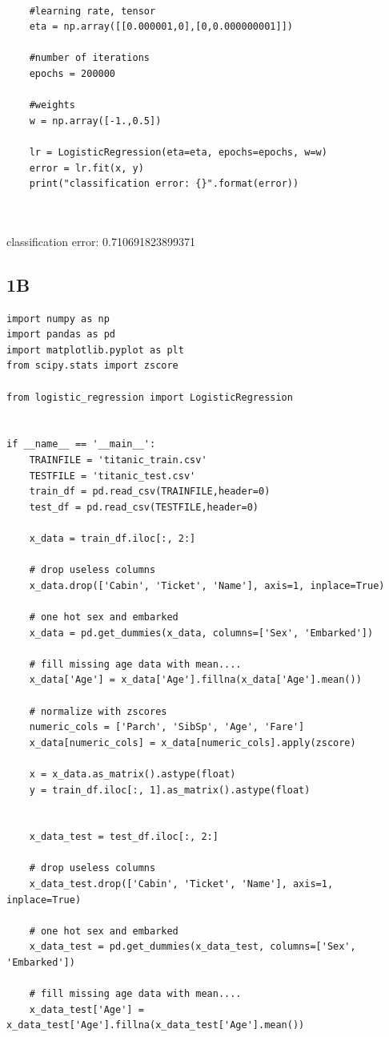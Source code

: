 \documentclass[12pt]{article}
\begin{document}
\begin{flushleft}
\begin{lstlisting}
	
	#learning rate, tensor
	eta = np.array([[0.000001,0],[0,0.000000001]])
	
	#number of iterations
	epochs = 200000
	
	#weights
	w = np.array([-1.,0.5])
	
	lr = LogisticRegression(eta=eta, epochs=epochs, w=w)
	error = lr.fit(x, y)
	print("classification error: {}".format(error))



		\end{lstlisting}
		
		classification error: 0.710691823899371
		
		\subsection*{1B}
		\begin{lstlisting}
import numpy as np 
import pandas as pd
import matplotlib.pyplot as plt
from scipy.stats import zscore

from logistic_regression import LogisticRegression


if __name__ == '__main__':
	TRAINFILE = 'titanic_train.csv'
	TESTFILE = 'titanic_test.csv'
	train_df = pd.read_csv(TRAINFILE,header=0)
	test_df = pd.read_csv(TESTFILE,header=0)
	
	x_data = train_df.iloc[:, 2:]
	
	# drop useless columns
	x_data.drop(['Cabin', 'Ticket', 'Name'], axis=1, inplace=True)
	
	# one hot sex and embarked
	x_data = pd.get_dummies(x_data, columns=['Sex', 'Embarked'])
	
	# fill missing age data with mean....
	x_data['Age'] = x_data['Age'].fillna(x_data['Age'].mean())
	
	# normalize with zscores
	numeric_cols = ['Parch', 'SibSp', 'Age', 'Fare']
	x_data[numeric_cols] = x_data[numeric_cols].apply(zscore)
	
	x = x_data.as_matrix().astype(float)
	y = train_df.iloc[:, 1].as_matrix().astype(float)
	
	
	x_data_test = test_df.iloc[:, 2:]
	
	# drop useless columns
	x_data_test.drop(['Cabin', 'Ticket', 'Name'], axis=1, inplace=True)
	
	# one hot sex and embarked
	x_data_test = pd.get_dummies(x_data_test, columns=['Sex', 'Embarked'])
	
	# fill missing age data with mean....
	x_data_test['Age'] = x_data_test['Age'].fillna(x_data_test['Age'].mean())
	

\end{lstlisting}
\end{flushleft}
\end{document}
